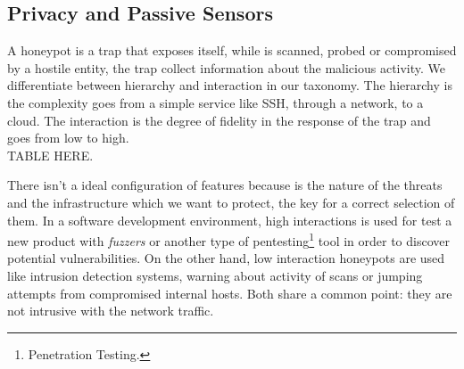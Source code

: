 \documentclass[a4paper]{llncs}
\begin{document}
\subsection{Privacy and Passive Sensors}
\label{sect:Privacy and Passive Sensors}
A honeypot is a trap that exposes itself, while is scanned, probed or compromised by a hostile entity, the trap collect information about the malicious activity. We differentiate between hierarchy and interaction in our taxonomy. The hierarchy is the complexity goes from a simple service like SSH, through a network, to a cloud. The interaction is the degree of fidelity in the response of the trap and goes from low to high.\\
TABLE HERE.

There isn't a ideal configuration of features because 
is the nature of the threats and the infrastructure which we want to protect, the key for a correct selection of them.
 In a software development environment, high interactions is used for 
 test a new product with {\it fuzzers} or another type of pentesting\footnote{Penetration Testing.}
  tool in order to discover potential vulnerabilities. On the other hand, low interaction honeypots are used like intrusion detection systems, warning about activity of scans or jumping attempts from compromised internal hosts. Both share a common point: they are not intrusive with the network traffic.

\end{document}
